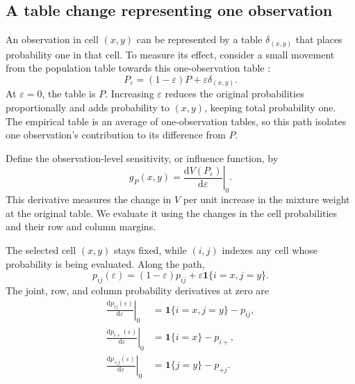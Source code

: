 \subsection{A table change representing one observation}

An observation in cell \((x,y)\) can be represented by a table
\(\delta_{(x,y)}\) that places probability one in that cell. To
measure its effect, consider a small movement from the population table
towards this one-observation table
\citep{hampel1974,vanderVaart1998}:
\begin{equation}
  P_\varepsilon=(1-\varepsilon)P+\varepsilon\delta_{(x,y)}.
  \label{eq:contamination-path}
\end{equation}
At \(\varepsilon=0\), the table is \(P\). Increasing
\(\varepsilon\) reduces the original probabilities proportionally and
adds probability to \((x,y)\), keeping total probability one. The
empirical table is an average of one-observation tables, so this path
isolates one observation's contribution to its difference from \(P\).

Define the observation-level sensitivity, or influence function, by
\begin{equation}
  g_P(x,y)
  =\left.\frac{\mathrm d V(P_\varepsilon)}{\mathrm d\varepsilon}
   \right|_0.
  \label{eq:g-definition}
\end{equation}
This derivative measures the change in \(V\) per unit increase in the
mixture weight at the original table. We evaluate it using the changes in
the cell probabilities and their row and column margins.

The selected cell \((x,y)\) stays fixed, while \((i,j)\) indexes
any cell whose probability is being evaluated. Along the path,
\begin{equation}
  p_{ij}(\varepsilon)
  =(1-\varepsilon)p_{ij}+\varepsilon\mathbf 1\{i=x,j=y\}.
\end{equation}
The joint, row, and column probability derivatives at zero are
\begin{align}
  \left.\frac{\mathrm d p_{ij}(\varepsilon)}{\mathrm d\varepsilon}
  \right|_0
  &=\mathbf 1\{i=x,j=y\}-p_{ij},
  \label{eq:joint-perturbation-derivative}\\
  \left.\frac{\mathrm d p_{i+}(\varepsilon)}{\mathrm d\varepsilon}
  \right|_0
  &=\mathbf 1\{i=x\}-p_{i+},\\
  \left.\frac{\mathrm d p_{+j}(\varepsilon)}{\mathrm d\varepsilon}
  \right|_0
  &=\mathbf 1\{j=y\}-p_{+j}.
\end{align}

